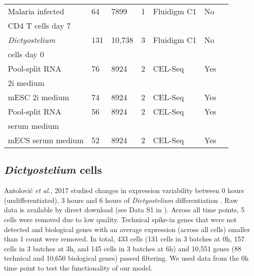 \begin{table}[ht	]
\begin{tabular}{lllllll}
Malaria infected  & 64       & 7899     & 1          & Fluidigm C1       & No   & \citep{Lonnberg2017}         \\
CD4\plus{}  T cells day 7    &   & &  &  &  &   \\
\midrule

\textit{Dictyostelium}             & 131      & 10,738    & 3          & Fluidigm C1       & No   & \citep{Antolovic2017}        \\
cells day 0  &  &   &   &  & & \\
\midrule

Pool-split RNA                 & 76       & 8924     & 2          & CEL-Seq           & Yes  & \citep{Grun2014}            \\
2i medium  &  &  & &  &  & \\
\midrule

mESC 2i medium    & 74       & 8924     & 2          & CEL-Seq           & Yes  & \citep{Grun2014} \\
\midrule

Pool-split RNA             & 56       & 8924     & 2          & CEL-Seq           & Yes  & \citep{Grun2014}            \\
serum medium &  &      &         &   &   &  \\
\midrule

mECS serum medium & 52       & 8924     & 2          & CEL-Seq           & Yes  & \citep{Grun2014} \\
\bottomrule       
\end{tabular}
\end{table}

\subsection{\textit{Dictyostelium} cells} \label{seq::data_dict}

Antolovi\'{c} \emph{et al.}, 2017 studied changes in expression variability between 0 hours (undifferentiated), 3 hours and 6 hours of \emph{Dictyostelium} differentiation \cite{Antolovic2017}. 
Raw data is available by direct download (see Data S1 in \citep{Antolovic2017}). 
Across all time points, 5 cells were removed due to low quality. Technical spike-in genes that were not detected and biological genes with an average expression (across all cells) smaller than 1 count were removed. 
In total, 433 cells (131 cells in 3 batches at 0h, 157 cells in 3 batches at 3h, and 145 cells in 3 batches at 6h) and 10,551 genes (88 technical and 10,650 biological genes) passed filtering. 
We used data from the 0h time point to test the functionality of our model.

